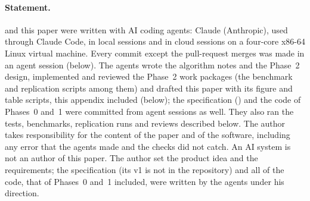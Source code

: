 \paragraph{Statement.}
 and this paper were written with AI coding agents: Claude (Anthropic), used through
Claude Code, in local sessions and in cloud sessions on a four-core x86-64 Linux virtual machine.
Every commit except the pull-request merges was made in an agent session (below).
The agents wrote the algorithm notes and the Phase~2 design, implemented and reviewed the Phase~2
work packages (the benchmark and replication scripts among them) and drafted this paper with its
figure and table scripts, this appendix included (below); the specification () and
the code of Phases~0 and~1 were committed from agent sessions as well.
They also ran the tests, benchmarks, replication runs and reviews described below.
The author takes responsibility for the content of the paper and of the software, including any
error that the agents made and the checks did not catch.
An AI system is not an author of this paper.
The author set the product idea and the requirements; the specification (its v1 is not in the
repository) and all of the code, that of Phases~0 and~1 included, were written by the agents under
his direction.

